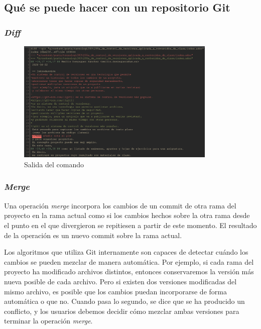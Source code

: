 \subsection{Qué se puede hacer con un repositorio Git}

\begin{frame}\frametitle{\textit{Diff}}
\begin{figure}[h]
    \centering
    \includegraphics[width=0.85\textwidth]{images/diff-example.png}
    \caption{Salida del comando }
\end{figure}

\href{https://github.com/alberto-ros/apuntes-aec/commit/8b114293d0a19697f0a8db69a6c8005bb6af8911}{}
\end{frame}

\begin{frame}\frametitle{\textit{Merge}}
Una operación \textit{merge} incorpora los cambios
de un commit de otra rama del proyecto
en la rama actual
como si los cambios hechos sobre la otra rama desde el punto en el que divergieron
se repitiesen a partir de este momento.
El resultado de la operación es un nuevo commit sobre la rama actual.

Los algoritmos que utiliza Git internamente son capaces de detectar
cuándo los cambios se pueden mezclar de manera automática.
Por ejemplo, si cada rama del proyecto ha modificado archivos distintos,
entonces conservaremos la versión más nueva posible de cada archivo.
Pero si existen dos versiones modificadas del mismo archivo,
es posible que los cambios puedan incorporarse de forma automática o que no.
Cuando pasa lo segundo, se dice que se ha producido un conflicto,
y los usuarios debemos decidir cómo mezclar ambas versiones
para terminar la operación \textit{merge}.
\end{frame}

